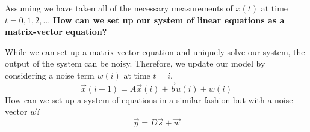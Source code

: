 \begin{enumerate}
  \qitem Assuming we have taken all of the necessary measurements of $x(t)$ at time $t = 0, 1, 2, ...$ \vskip 1pt
  \textbf{How can we set up our system of linear equations as a matrix-vector equation?}

  \ws{\vspace{100px}}


  \qitem While we can set up a matrix vector equation and uniquely solve our system, the output of the system can be noisy.
  Therefore, we update our model by considering a noise term $w(i)$ at time $t = i.$
  \begin{equation}
    \vec{x}(i + 1) = A \vec{x}(i) + \vec{b} u(i) + w(i)
  \end{equation}
  How can we set up a system of equations in a similar fashion but with a noise vector $\vec{w}?$
  \begin{equation}
    \vec{y} = D \vec{s} + \vec{w}
  \end{equation}


\end{enumerate}
